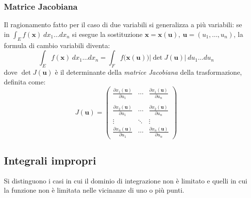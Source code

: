 \documentclass[10pt, a4paper]{scrartcl}
\theoremstyle{definition}
\numberwithin{esempio}{section}
\theoremstyle{definition}
\numberwithin{obs}{section}
\numberwithin{nota}{section}
\numberwithin{equation}{subsection}
\begin{document}
\subsubsection{Matrice Jacobiana}
Il ragionamento fatto per il caso di due variabili si generalizza a pi\`u variabili: se in $\int_{E} f(\mathbf{x} ) \ dx_1 \ldots dx_n$ si esegue la sostituzione $\mathbf{x} = \mathbf{x} (\mathbf{u} ) ,\ \mathbf{u} =(u_1,\ldots,u_n)$, la formula di cambio variabili diventa:
\begin{equation}
	\int_{E} f(\mathbf{x} )\ dx_1\ldots dx_n = \int_{F} f\big(\mathbf{x}(\mathbf{u} ) \big) \lvert \det J(\mathbf{u} ) \rvert\ du_1\ldots du_n
\end{equation}
dove $\det J(\mathbf{u} )$ \`e il determinante della \textit{matrice Jacobiana} della trasformazione, definita come:
\begin{equation}
	J(\mathbf{u} ) = \begin{pmatrix} \displaystyle \frac{\partial x_1(\mathbf{u} )}{\partial u_1} & \cdots &\displaystyle \frac{\partial x_1(\mathbf{u} )}{\partial u_n} \\ &&\\\displaystyle \frac{\partial x_2(\mathbf{u} )}{\partial u_1}& \cdots &\displaystyle \frac{\partial x_2(\mathbf{u} )}{\partial u_n}  \\ \vdots &\ddots & \vdots \\ \displaystyle \frac{\partial x_n(\mathbf{u} )}{\partial u_1} & \cdots &\displaystyle \frac{\partial x_n(\mathbf{u} )}{\partial u_n}\end{pmatrix} 
\end{equation}
\subsection{Integrali impropri}
Si distinguono i casi in cui il dominio di integrazione non \`e limitato e quelli in cui la funzione non \`e limitata nelle vicinanze di uno o pi\`u punti.
\end{document}
